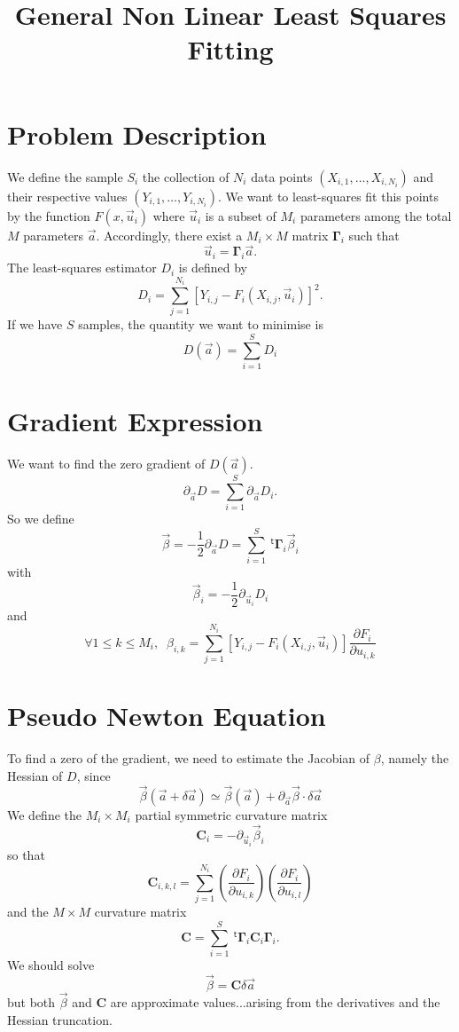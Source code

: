 \documentclass[aps,twocolumn]{revtex4}
\newcommand{\mymat}[1]{\boldsymbol{#1}}
\newcommand{\mytrn}[1]{~^{\mathsf{t}}#1}
\begin{document}
\title{General Non Linear Least Squares Fitting}
\maketitle

\section{Problem Description}
We define the sample $S_i$ the collection of $N_i$ data points $(X_{i,1},\ldots,X_{i,N_i})$
and their respective values $(Y_{i,1},\ldots,Y_{i,N_i})$.
We want to least-squares fit this points by the function $F(x,\vec{u}_i)$
where $\vec{u}_i$ is a subset of $M_i$ parameters among the total $M$ parameters $\vec{a}$.
Accordingly, there exist a $M_i \times M$ matrix $\mymat{\Gamma}_i$ such that
$$
	\vec{u}_i = \mymat{\Gamma}_i \vec{a}.
$$
The least-squares estimator $D_i$ is defined by
$$
	D_i = \sum_{j=1}^{N_i} \left[Y_{i,j} - F_i\left(X_{i,j},\vec{u}_i\right) \right]^2.
$$
If we have $S$ samples,
the quantity we want to minimise is
$$
	D\left(\vec{a}\right) = \sum_{i=1}^S D_i
$$

\section{Gradient Expression}
We want to find the zero gradient of $D(\vec{a})$.
$$
	\partial_{\vec{a}} D = \sum_{i=1}^{S} \partial_{\vec{a}} D_i.
$$
So we define 
$$
	\vec{\beta} = -\dfrac{1}{2} \partial_{\vec{a}} D = \sum_{i=1}^{S} \mytrn{\mymat{\Gamma}}_i \vec{\beta}_i
$$
with
$$
	\vec{\beta}_{i} = -\dfrac{1}{2} \partial_{\vec{u}_i} D_i 
$$
and
$$
	\forall 1 \leq k \leq M_i, \;\; \beta_{i,k} =	 \sum_{j=1}^{N_i}\left[Y_{i,j} - F_i\left(X_{i,j},\vec{u}_i\right) \right]\dfrac{\partial F_i}{\partial u_{i,k}}
$$

\section{Pseudo Newton Equation}
To find a zero of the gradient, we need to estimate the Jacobian of $\beta$, namely the Hessian of $D$, since
$$
	 \vec\beta\left(\vec{a}+\delta\vec{a}\right) \simeq \vec\beta\left(\vec{a}\right) + \partial_{\vec{a}} \vec{\beta} \cdot \delta\vec{a}
$$
We define the $M_i \times M_i$ partial symmetric curvature  matrix 
$$
	\mymat{C}_i = -\partial_{\vec{u}_i} \vec{\beta}_i
$$
so that
$$
	\mymat{C}_{i,k,l} = \sum_{j=1}^{N_i} \left(\dfrac{\partial F_i}{\partial u_{i,k}}\right) \left(\dfrac{\partial F_i}{\partial u_{i,l}}\right)
$$
and the $M\times M$ curvature matrix
$$
	\mymat{C} = \sum_{i=1}^{S} \mytrn{\mymat{\Gamma}}_i \mymat{C}_i \mymat{\Gamma}_i.
$$
We should solve
$$
	\vec{\beta} = \mymat{C} \delta\vec{a}
$$
but both $\vec{\beta}$ and $\mymat{C}$ are approximate values...arising from the derivatives and the Hessian truncation.
\end{document}
